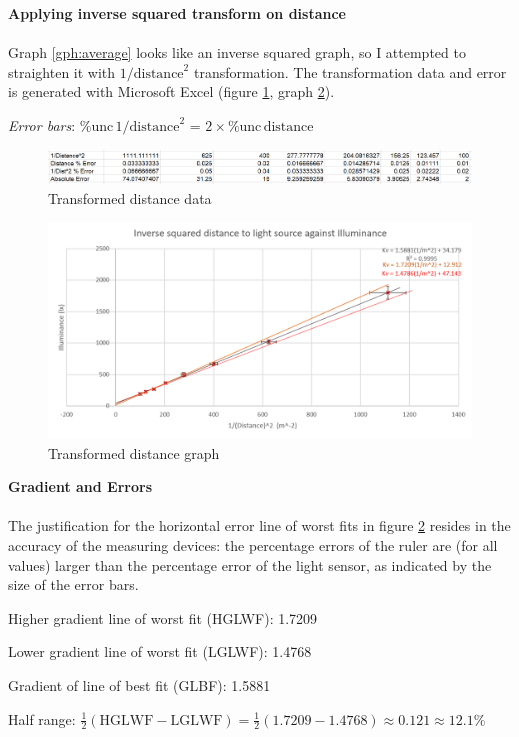 \documentclass[a4paper,12pt]{article}
\newcommand{\relun}{\% \text{unc}\,}
\newcommand{\paragraphnl}[1]{\textbf{#1}\\\\}
\begin{document}
\paragraphnl{Applying inverse squared transform on distance}
Graph \ref{gph:average} looks like an inverse squared graph, so I attempted to straighten it with $1/{\text{distance}}^2$ transformation. The transformation data and error is generated with Microsoft Excel (figure \ref{fig:tdata}, graph \ref{gph:tdata}).

\textit{Error bars}: $\relun 1/{\text{distance}}^2$ = $2 \times \relun \text{distance}$

\begin{figure}[H]
    \centering
    \includegraphics[width=\textwidth]{assets/transformdata.png}
    \caption{Transformed distance data}
    \label{fig:tdata}
\end{figure}

\begin{figure}[H]
    \centering
    \includegraphics[width=\textwidth]{assets/transformgraph.png}
    \caption{Transformed distance graph}
    \label{gph:tdata}
\end{figure}

\paragraphnl{Gradient and Errors}
The justification for the horizontal error line of worst fits in figure \ref{gph:tdata} resides in the accuracy of the measuring devices: the percentage errors of the ruler are (for all values) larger than the percentage error of the light sensor, as indicated by the size of the error bars.


Higher gradient line of worst fit (HGLWF): 1.7209

Lower gradient line of worst fit (LGLWF): 1.4768

Gradient of line of best fit (GLBF): 1.5881

Half range: $\frac{1}{2} (\text{HGLWF} - \text{LGLWF})= \frac{1}{2}(1.7209-1.4768) \approx 0.121 \approx 12.1\% $
\end{document}
